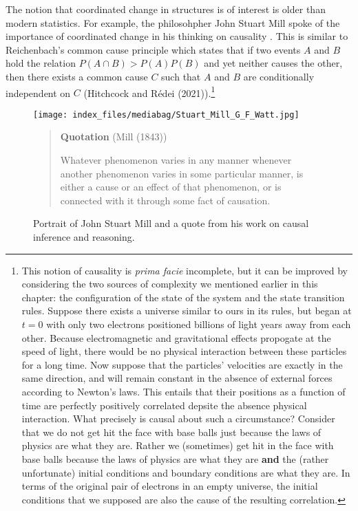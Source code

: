 \documentclass[
  letterpaper,
  DIV=11,
  numbers=noendperiod]{scrreprt}
\begin{document}
The notion that coordinated change in structures is of interest is older
than modern statistics. For example, the philosohpher John Stuart Mill
spoke of the importance of coordinated change in his thinking on
causality \cite{Mill1843}. This is similar to Reichenbach's common cause
principle which states that if two events \(A\) and \(B\) hold the
relation \(P(A \cap B) > P(A)P(B)\) and yet neither causes the other,
then there exists a common cause \(C\) such that \(A\) and \(B\) are
conditionally independent on \(C\) (Hitchcock and Rédei
(2021)).\footnote{This notion of causality is \textit{prima facie} incomplete, but it can be improved by considering the two sources of complexity we mentioned earlier in this chapter: the configuration of the state of the system and the state transition rules. Suppose there exists a universe similar to ours in its rules, but began at $t=0$ with only two electrons positioned billions of light years away from each other. Because electromagnetic and gravitational effects propogate at the speed of light, there would be no physical interaction between these particles for a long time. Now suppose that the particles' velocities are exactly in the same direction, and will remain constant in the absence of external forces according to Newton's laws. This entails that their positions as a function of time are perfectly positively correlated depsite the absence physical interaction. What precisely is causal about such a circumstance? Consider that we do not get hit the face with base balls just because the laws of physics are what they are. Rather we (sometimes) get hit in the face with base balls because the laws of physics are what they are \textbf{and} the (rather unfortunate) initial conditions and boundary conditions are what they are. In terms of the original pair of electrons in an empty universe, the initial conditions that we supposed are also the cause of the resulting correlation.}

\begin{figure}

\begin{minipage}{0.50\linewidth}

\texttt{[image: index\_files/mediabag/Stuart\_Mill\_G\_F\_Watt.jpg]}

\end{minipage}%
%
\begin{minipage}{0.50\linewidth}

\begin{quote}
\textbf{Quotation} (Mill (1843))

Whatever phenomenon varies in any manner whenever another phenomenon
varies in some particular manner, is either a cause or an effect of that
phenomenon, or is connected with it through some fact of causation.
\end{quote}

\end{minipage}%

\caption{\label{fig-john-stuart-mill}Portrait of John Stuart Mill and a
quote from his work on causal inference and reasoning.}

\end{figure}%
\end{document}
